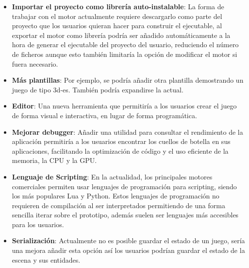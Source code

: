 \begin{itemize}
	\item \textbf{Importar el proyecto como librería auto-instalable}: La forma de trabajar con el motor actualmente
	requiere descargarlo como parte del proyecto que los usuarios quieran hacer para construir el ejecutable, al exportar
    el motor como librería podría ser añadido automáticamente a la hora de generar el ejecutable del proyecto del usuario,
    reduciendo el número de ficheros aunque esto también limitaría la opción de modificar el motor si fuera necesario.
    \item \textbf{Más plantillas}: Por ejemplo, se podría añadir otra plantilla demostrando un juego de tipo \gls{3d-es}. También
    podría expandirse la actual.
    \item \textbf{Editor}: Una nueva herramienta que permitiría a los usuarios crear el juego de forma visual e interactiva,
    en lugar de forma programática.
    \item \textbf{Mejorar debugger}: Añadir una utilidad para consultar el rendimiento de la aplicación permitiría a los usuarios
    encontrar los cuellos de botella en sus aplicaciones, facilitando la optimización de código y el uso eficiente de la memoria, la CPU y la GPU.
    \item \textbf{Lenguaje de Scripting}: En la actualidad, los principales motores comerciales permiten usar lenguajes 
    de programación para scripting, siendo los más populares Lua y Python. Estos lenguajes de programación no requieren
    de compilación al ser interpretados permitiendo de una forma sencilla iterar sobre el prototipo, además suelen
    ser lenguajes más accesibles para los usuarios.
    \item \textbf{Serialización}: Actualmente no es posible guardar el estado de un juego, sería una mejora añadir esta opción
    así los usuarios podrían guardar el estado de la escena y sus entidades.

\end{itemize}
